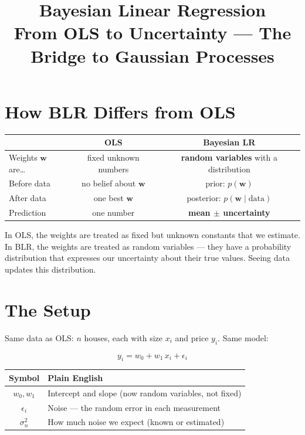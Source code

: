 \documentclass[11pt, a4paper]{article}
\title{\color{secblue}\textbf{Bayesian Linear Regression}\\[0.3em]
\Large From OLS to Uncertainty --- The Bridge to Gaussian Processes}
\author{}
\date{}
\newcommand{\gut}[1]{\begin{tcolorbox}[colback=lightyellow, colframe=orange!50, title=Gut feeling]#1\end{tcolorbox}}
\begin{document}
\maketitle
\thispagestyle{fancy}


\section*{\color{secblue}How BLR Differs from OLS}

\begin{center}
\renewcommand{\arraystretch}{1.4}
\begin{tabular}{lcc}
\toprule
& \textbf{OLS} & \textbf{Bayesian LR} \\
\midrule
Weights $\mathbf{w}$ are\ldots & fixed unknown numbers & \textbf{random variables} with a distribution \\
Before data & no belief about $\mathbf{w}$ & prior: $p(\mathbf{w})$ \\
After data & one best $\mathbf{w}$ & posterior: $p(\mathbf{w} \mid \text{data})$ \\
Prediction & one number & \textbf{mean $\pm$ uncertainty} \\
\bottomrule
\end{tabular}
\end{center}

\gut{
In OLS, the weights are treated as fixed but unknown constants that we estimate.
In BLR, the weights are treated as random variables --- they have a probability distribution that expresses our uncertainty about their true values. Seeing data updates this distribution.
}


\section*{\color{secblue}The Setup}

Same data as OLS: $n$ houses, each with size $x_i$ and price $y_i$.
Same model:

\begin{equation}
y_i = w_0 + w_1 \, x_i + \epsilon_i
\tag{B-1}
\end{equation}

\begin{center}
\begin{tabular}{cl}
\toprule
\textbf{Symbol} & \textbf{Plain English} \\
\midrule
$w_0, w_1$ & Intercept and slope (now random variables, not fixed) \\
$\epsilon_i$ & Noise --- the random error in each measurement \\
$\sigma_n^2$ & How much noise we expect (known or estimated) \\
\bottomrule
\end{tabular}
\end{center}
\end{document}
